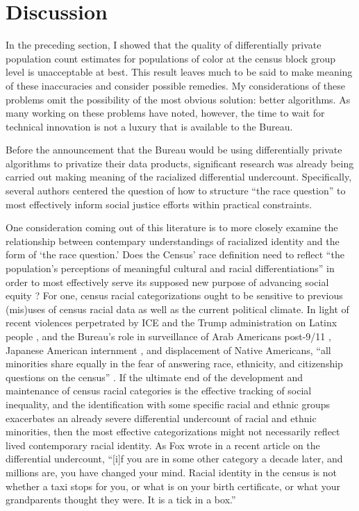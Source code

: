 \section{Discussion}\label{sec:disc}

In the preceding section, I showed that the quality of differentially private population count estimates for populations of color at the census block group level is unacceptable at best. This result leaves much to be said to make meaning of these inaccuracies and consider possible remedies. My considerations of these problems omit the possibility of the most obvious solution: better algorithms. As many working on these problems have noted, however, the time to wait for technical innovation is not a luxury that is available to the Bureau.

Before the announcement that the Bureau would be using differentially private algorithms to privatize their data products, significant research was already being carried out making meaning of the racialized differential undercount. Specifically, several authors centered the question of how to structure ``the race question'' to most effectively inform social justice efforts within practical constraints.

One consideration coming out of this literature is to more closely examine the relationship between contempary understandings of racialized identity and the form of `the race question.' Does the Census' race definition need to reflect ``the population's perceptions of meaningful cultural and racial differentiations'' in order to most effectively serve its supposed new purpose of advancing social equity \cite{espiritu_asian_1992}? For one, census racial categorizations ought to be sensitive to previous (mis)uses of census racial data as well as the current political climate. In light of recent violences perpetrated by ICE and the Trump administration on Latinx people \cite{fox_differential_2018}, and the Bureau's role in surveillance of Arab Americans post-9/11 \cite{beydoun_demographic_2015}, Japanese American internment \cite{anderson_public_2015}, and displacement of Native Americans, ``all minorities share equally in the fear of answering race, ethnicity, and citizenship questions on the census'' \cite{fox_differential_2018}. If the ultimate end of the development and maintenance of census racial categories is the effective tracking of social inequality, and the identification with some specific racial and ethnic groups exacerbates an already severe differential undercount of racial and ethnic minorities, then the most effective categorizations might not necessarily reflect lived contemporary racial identity. As Fox wrote in a recent article on the differential undercount, ``[i]f you are in some other category a decade later, and millions are, you have changed your mind. Racial identity in the census is not whether a taxi stops for you, or what is on your birth certificate, or what your grandparents thought they were. It is a tick in a box.'' \cite{fox_differential_2018}

